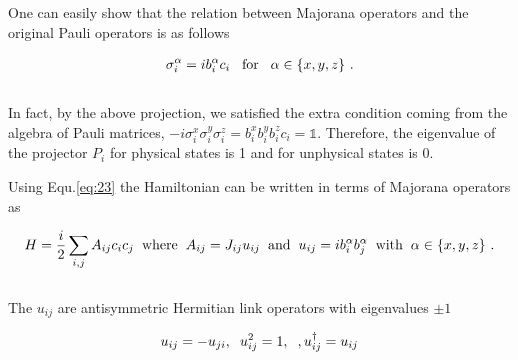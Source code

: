 \documentclass{article}
\begin{document}
One can easily show that the relation between Majorana operators and the original Pauli operators is as follows

\begin{equation}\label{eq:23}
    \begin{aligned}
        \sigma^\alpha_i = i b^\alpha_i c_i \hspace{3mm}\text{for}\hspace{3mm} \alpha\in \{x,y,z\}~.\\
    \end{aligned}
\end{equation}{}\\

In fact, by the above projection, we satisfied the extra condition coming from the algebra of Pauli matrices, $-i\sigma^x_i\sigma^y_i\sigma^z_i = b^x_i b^y_i b^z_i c_i = \mathbb{1}$. Therefore, the eigenvalue of the projector $P_i$ for physical states is 1 and for unphysical states is 0.

Using Equ.\hspace{0.2mm}\ref{eq:23} the Hamiltonian can be written in terms of Majorana operators as

\begin{equation}\label{eq:24}
	\begin{aligned}
		H = \frac{i}{2} \sum_{i,j} A_{ij} c_i c_j \hspace{2mm}\text{where}\hspace{2mm} A_{ij} = J_{ij} u_{ij} \hspace{2mm}\text{and}\hspace{2mm} u_{ij} = i b^\alpha_i b^\alpha_j \hspace{2mm}\text{with}\hspace{2mm} \alpha\in \{x,y,z\}~.
	\end{aligned}
\end{equation}\\

The $u_{ij}$ are antisymmetric Hermitian link operators with eigenvalues $\pm 1$

\begin{equation}\label{eq:25}
	\begin{aligned}
		u_{ij} = -u_{ji}, \hspace{2mm} u^2_{ij} = 1, \hspace{2mm}, u^\dagger_{ij} = u_{ij}
	\end{aligned}
\end{equation}\\
\end{document}
